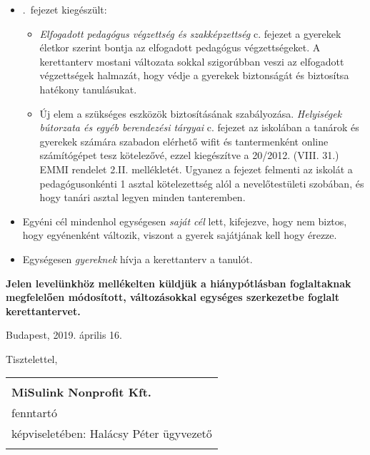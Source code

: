 \begin{itemize}
      \item {}.~fejezet kiegészült:
            \begin{itemize}
                  \item \emph{Elfogadott pedagógus végzettség és szakképzettség} c.
                        fejezet a gyerekek életkor szerint bontja
                        az elfogadott pedagógus végzettségeket. A kerettanterv
                        mostani változata sokkal
                        szigorúbban veszi az elfogadott végzettségek halmazát, hogy
                        védje a gyerekek
                        biztonságát és biztosítsa hatékony tanulásukat.
                  \item Új elem a szükséges eszközök biztosításának szabályozása. \emph{Helyiségek
                              bútorzata és egyéb berendezési tárgyai} c. fejezet
                         az
                        iskolában a tanárok és gyerekek számára szabadon elérhető
                        wifit és tantermenként online számítógépet tesz kötelezővé,
                        ezzel
                        kiegészítve a 20/2012. (VIII. 31.) EMMI rendelet 2.II.
                        mellékletét. Ugyanez a fejezet
                        felmenti az iskolát a pedagógusonkénti 1 asztal
                        kötelezettség
                        alól a
                        nevelőtestületi szobában, és hogy tanári asztal legyen minden tanteremben.

            \end{itemize}

      \item Egyéni cél mindenhol egységesen \emph{saját cél} lett, kifejezve, hogy nem
            biztos, hogy egyénenként változik, viszont a gyerek sajátjának kell hogy érezze.
      \item Egységesen \emph{gyereknek} hívja a kerettanterv a tanulót.
\end{itemize}

\noindent
\textbf{Jelen levelünkhöz mellékelten küldjük a hiánypótlásban foglaltaknak
      megfelelően módosított, változásokkal egységes szerkezetbe foglalt
      kerettantervet.}

\vspace{0.75cm}

\noindent
Budapest, 2019. április 16.

\vspace{0.75cm}
\noindent
Tisztelettel,

\vspace{0.75cm}
\noindent
\begin{center}
      \begin{tabular}{p{8cm}}
            \begin{center}
                  \hrulefill \\
                  \textbf{MiSulink Nonprofit Kft.} \\
                  fenntartó\\
                  képviseletében: Halácsy Péter ügyvezető \\
            \end{center}
      \end{tabular}
\end{center}
\newpage